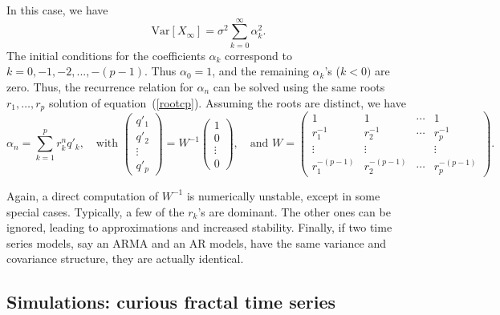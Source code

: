 \documentclass[oneside,10pt]{book}
\begin{document}
In this case, we have
$$
\text{Var}[X_\infty]=\sigma^2\sum_{k=0}^\infty \alpha_k^{2}.
$$
The initial conditions for the coefficients $\alpha_k$ correspond to $k = 0, -1, -2, ..., -(p -1)$. Thus $\alpha_0=1$, and the remaining $\alpha_k$'s ($k<0)$ are zero. Thus, the recurrence relation for $\alpha_n$ can be solved
using the same roots $r_1,\dots,r_p$ solution of equation~(\ref{rootcp}). Assuming the roots are distinct, we have
\begin{equation}\label{recurr}
\alpha_n = \sum_{k=1}^p r_k^n q'_k, \quad \text{with }
\left(
\begin{aligned}
      q'_1\\
     q'_2 \\
     \vdots \\
    q'_p
\end{aligned}
\right) = W^{-1} \left(
\begin{array}{c}
      1 \\
     0\\
     \vdots \\
    0
\end{array}
\right),
\quad \text{and }
W=\left(
\begin{array}{cccc}
      1 & 1 & \cdots & 1 \\
     r_1^{-1} & r_2^{-1} & \cdots & r_p^{-1} \\
     \vdots & \vdots &  & \vdots \\
    r_1^{-(p-1)} &  r_2^{-(p-1)} &\cdots  &  r_p^{-(p-1)}
\end{array}
\right).
\end{equation}

\noindent Again, a direct computation of $W^{-1}$ is numerically unstable, except in some special cases. Typically, a few of the $r_k$'s are dominant. The other ones can be ignored, leading to approximations and increased stability.
Finally, if two time series models, say an ARMA and an AR models, have the same variance and covariance structure, they are actually identical.

\subsection{Simulations: curious fractal time series}
\end{document}
